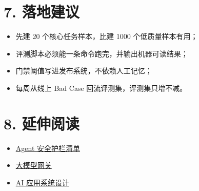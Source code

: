 \documentclass[9pt,a4paper,twocolumn]{ctexart}
\begin{document}
\section*{7. 落地建议}

\begin{itemize}[itemsep=1pt, topsep=2pt]
  \item 先建 20 个核心任务样本，比建 1000 个低质量样本有用；
  \item 评测脚本必须能一条命令跑完，并输出机器可读结果；
  \item 门禁阈值写进发布系统，不依赖人工记忆；
  \item 每周从线上 Bad Case 回流评测集，评测集只增不减。
\end{itemize}


\section*{8. 延伸阅读}

\begin{itemize}[itemsep=1pt, topsep=2pt]
  \item \href{../06-安全与治理/01-Agent安全护栏清单.md}{Agent 安全护栏清单}
  \item \href{../04-工程实践/04-大模型网关.md}{大模型网关}
  \item \href{../07-系统设计/01-AI应用系统设计.md}{AI 应用系统设计}
\end{itemize}
\end{document}
